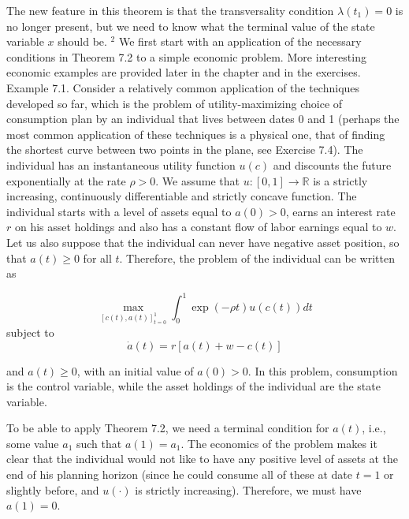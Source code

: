 \documentclass[\topdir/lecture_notes.tex]{subfiles}
\begin{document}
The new feature in this theorem is that the transversality condition $\lambda\left(t_{1}\right)=0$ is no longer present, but we need to know what the terminal value of the state variable $x$ should be. ${ }^{2}$ We first start with an application of the necessary conditions in Theorem 7.2 to a simple economic problem. More interesting economic examples are provided later in the chapter and in the exercises.\\
Example 7.1. Consider a relatively common application of the techniques developed so far, which is the problem of utility-maximizing choice of consumption plan by an individual that lives between dates 0 and 1 (perhaps the most common application of these techniques is a physical one, that of finding the shortest curve between two points in the plane, see Exercise 7.4). The individual has an instantaneous utility function $u(c)$ and discounts the future exponentially at the rate $\rho>0$. We assume that $u:[0,1] \rightarrow \mathbb{R}$ is a strictly increasing, continuously differentiable and strictly concave function. The individual starts with a level of assets equal to $a(0)>0$, earns an interest rate $r$ on his asset holdings and also has a constant flow of labor earnings equal to $w$. Let us also suppose that the individual can never have negative asset position, so that $a(t) \geq 0$ for all $t$. Therefore, the problem of the individual can be written as

\[
\max _{[c(t), a(t)]_{t=0}^{1}} \int_{0}^{1} \exp (-\rho t) u(c(t)) d t
\]
subject to
\[
\dot{a}(t)=r[a(t)+w-c(t)]
\]

and $a(t) \geq 0$, with an initial value of $a(0)>0$. In this problem, consumption is the control variable, while the asset holdings of the individual are the state variable.

To be able to apply Theorem 7.2, we need a terminal condition for $a(t)$, i.e., some value $a_{1}$ such that $a(1)=a_{1}$. The economics of the problem makes it clear that the individual would not like to have any positive level of assets at the end of his planning horizon (since he could consume all of these at date $t=1$ or slightly before, and $u(\cdot)$ is strictly increasing). Therefore, we must have $a(1)=0$.
\end{document}
